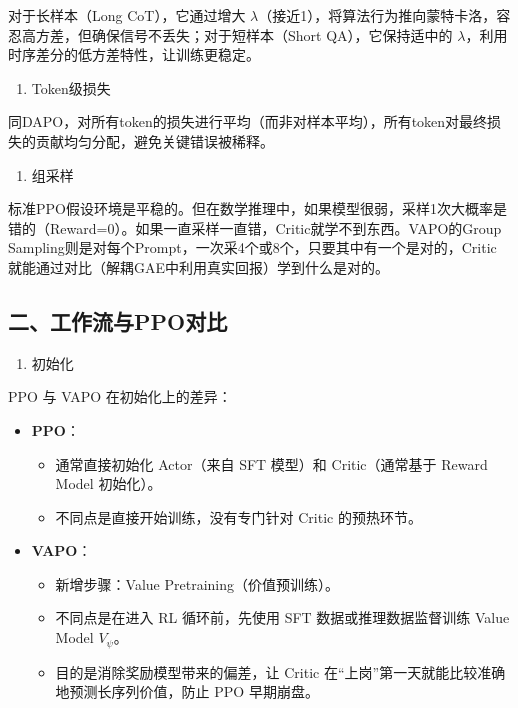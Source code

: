 对于长样本（Long CoT），它通过增大 \(\lambda\)（接近1），将算法行为推向蒙特卡洛，容忍高方差，但确保信号不丢失；对于短样本（Short QA），它保持适中的 \(\lambda\)，利用时序差分的低方差特性，让训练更稳定。

\begin{enumerate}
\def\labelenumi{\arabic{enumi}.}
\setcounter{enumi}{3}
\tightlist
\item
  Token级损失
\end{enumerate}

同DAPO，对所有token的损失进行平均（而非对样本平均），所有token对最终损失的贡献均匀分配，避免关键错误被稀释。

\begin{enumerate}
\def\labelenumi{\arabic{enumi}.}
\setcounter{enumi}{4}
\tightlist
\item
  组采样
\end{enumerate}

标准PPO假设环境是平稳的。但在数学推理中，如果模型很弱，采样1次大概率是错的（Reward=0）。如果一直采样一直错，Critic就学不到东西。VAPO的Group Sampling则是对每个Prompt，一次采4个或8个，只要其中有一个是对的，Critic 就能通过对比（解耦GAE中利用真实回报）学到什么是对的。

\hypertarget{ux4e8cux5de5ux4f5cux6d41ux4e0eppoux5bf9ux6bd4}{%
\subsection{二、工作流与PPO对比}\label{ux4e8cux5de5ux4f5cux6d41ux4e0eppoux5bf9ux6bd4}}

\begin{enumerate}
\def\labelenumi{\arabic{enumi}.}
\tightlist
\item
  初始化
\end{enumerate}

PPO 与 VAPO 在初始化上的差异：

\begin{itemize}
\tightlist
\item
{}
  \textbf{PPO}：

  \begin{itemize}
  \tightlist
  \item
    通常直接初始化 Actor（来自 SFT 模型）和 Critic（通常基于 Reward Model 初始化）。
  \item
    不同点是直接开始训练，没有专门针对 Critic 的预热环节。
  \end{itemize}
\item
{}
  \textbf{VAPO}：

  \begin{itemize}
  \tightlist
  \item
    新增步骤：Value Pretraining（价值预训练）。
  \item
    不同点是在进入 RL 循环前，先使用 SFT 数据或推理数据监督训练 Value Model \(V_\psi\)。
  \item
    目的是消除奖励模型带来的偏差，让 Critic 在``上岗''第一天就能比较准确地预测长序列价值，防止 PPO 早期崩盘。
  \end{itemize}
\end{itemize}

